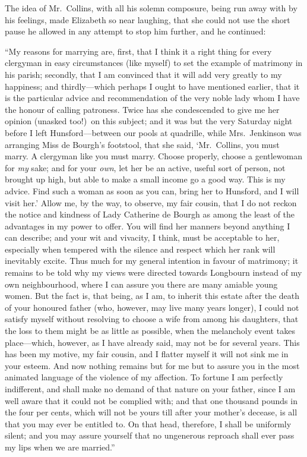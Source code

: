 \documentclass[12pt,english,oneside]{book}
\begin{document}
The idea of Mr.\ Collins, with all his solemn composure, being run
away with by his feelings, made Elizabeth so near laughing, that she
could not use the short pause he allowed in any attempt to stop him
further, and he continued:

{}``My reasons for marrying are, first, that I think it a right thing
for every clergyman in easy circumstances (like myself) to set the
example of matrimony in his parish; secondly, that I am convinced
that it will add very greatly to my happiness; and thirdly\mbox{---}which
perhaps I ought to have mentioned earlier, that it is the particular
advice and recommendation of the very noble lady whom I have the honour
of calling patroness. Twice has she condescended to give me her opinion
(unasked too!)\ on this subject; and it was but the very Saturday
night before I left Hunsford\mbox{--}--between our pools at quadrille,
while Mrs.\ Jenkinson was arranging Miss de Bourgh's footstool, that
she said, `Mr.\ Collins, you must marry. A clergyman like you must
marry. Choose properly, choose a gentlewoman for \textit{my} sake;
and for your \textit{own}, let her be an active, useful sort of person,
not brought up high, but able to make a small income go a good way.
This is my advice. Find such a woman as soon as you can, bring her
to Hunsford, and I will visit her.' Allow me, by the way, to observe,
my fair cousin, that I do not reckon the notice and kindness of Lady
Catherine de Bourgh as among the least of the advantages in my power
to offer. You will find her manners beyond anything I can describe;
and your wit and vivacity, I think, must be acceptable to her, especially
when tempered with the silence and respect which her rank will inevitably
excite. Thus much for my general intention in favour of matrimony;
it remains to be told why my views were directed towards Longbourn
instead of my own neighbourhood, where I can assure you there are
many amiable young women. But the fact is, that being, as I am, to
inherit this estate after the death of your honoured father (who,
however, may live many years longer), I could not satisfy myself without
resolving to choose a wife from among his daughters, that the loss
to them might be as little as possible, when the melancholy event
takes place\mbox{---}which, however, as I have already said, may
not be for several years. This has been my motive, my fair cousin,
and I flatter myself it will not sink me in your esteem. And now nothing
remains but for me but to assure you in the most animated language
of the violence of my affection. To fortune I am perfectly indifferent,
and shall make no demand of that nature on your father, since I am
well aware that it could not be complied with; and that one thousand
pounds in the four per cents, which will not be yours till after your
mother's decease, is all that you may ever be entitled to. On that
head, therefore, I shall be uniformly silent; and you may assure yourself
that no ungenerous reproach shall ever pass my lips when we are married.''
\end{document}
